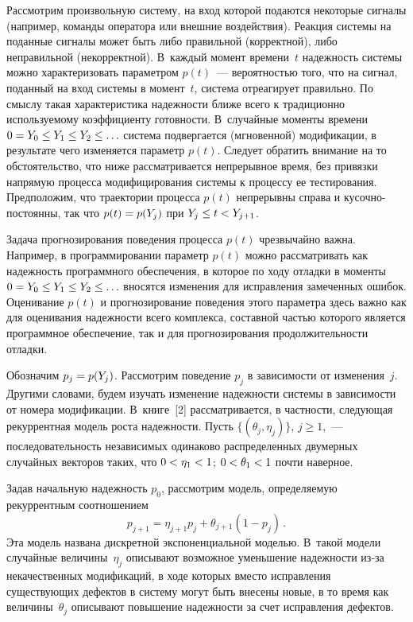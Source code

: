 \begin{multicols}{2}
Рассмотрим произвольную сис\-те\-му, на вход которой подаются
некоторые сигналы (например, команды оператора или внешние
воздействия). Реакция сис\-те\-мы на поданные сигналы может быть либо
правильной (корректной), либо неправильной (некорректной). В~каждый
момент времени~$t$ надежность сис\-те\-мы можно характеризовать
параметром $p(t)$~--- вероятностью того, что на сигнал, поданный на
вход системы в момент~$t$, сис\-те\-ма отреагирует правильно. По смыслу
такая характеристика надежности ближе всего к традиционно
используемому коэффициенту готовности. В~случайные моменты времени
$0\hm=Y_0\hm\le Y_1 \hm\le Y_2 \hm\le\ldots$ сис\-те\-ма подвергается (мгновенной)
модификации, в результате чего изменяется параметр $p(t)$. Следует
обратить внимание на то обстоятельство, что ниже рассматривается
непрерывное время, без привязки напрямую процесса модифицирования
системы к процессу ее тестирования. Предположим, что траектории
процесса $p(t)$ непрерывны справа и ку\-соч\-но-по\-сто\-ян\-ны, так что $p(t)
\hm= p(Y_j)$ при $Y_j \hm\le t\hm< Y_{j+1}$.

Задача прогнозирования  поведения процесса $p(t)$ чрезвычайно важна.
Например, в программировании параметр $p(t)$ можно рас\-смат\-ри\-вать как
надежность программного  обеспечения, в которое по ходу отладки в
моменты $0\hm=Y_0\hm\le Y_1 \hm\le Y_2 \le\ldots$ вносятся изменения для
исправления замеченных ошибок. Оценивание $p(t)$ и прогнозирование
поведения этого параметра здесь важно как для оценивания надежности
всего комплекса, со\-став\-ной \mbox{частью} которого является программное
обеспечение, так и для прогнозирования продолжитель\-ности от\-ладки.
{

}

Обозначим $p_j \hm= p(Y_j)$. Рассмотрим  поведение $p_j$ в зависимости
от изменения~$j$. Другими словами, будем изучать изменение
надежности сис\-те\-мы в зависимости от номера модификации. В~книге~[2]
рассматривается, в частности, следующая рекуррентная модель роста
надежности.  Пусть  $\{(\theta_j, \eta_j)\}$, $j\ge1$,~---
последовательность независимых одинаково распределенных двумерных
случайных векторов таких, что $0 \hm< \eta_1 \hm< 1$; $0 \hm< \theta_1\hm  < 1$
почти наверное.

Задав начальную надежность $p_0$, рассмотрим модель, определяемую рекуррентным
соотноше\-нием
$$
p_{j+1} = \eta_{j+1}p_j + \theta_{j+1}\left(1-p_j\right)\,.
$$
Эта модель названа дискретной  экспоненциальной моделью. В~такой
модели случайные величины~$\eta_j$ описывают возможное уменьшение
надежности из-за некачественных модификаций, в ходе которых вместо
исправления существующих дефектов в сис\-те\-му могут быть внесены
новые, в то время как величины~$\theta_j$ описывают повышение
надежности за счет исправления дефектов.


\end{multicols}
